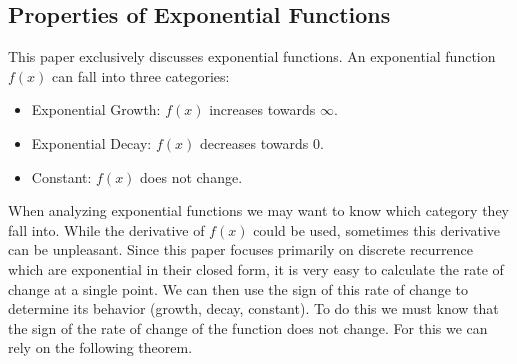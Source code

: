 \documentclass{article}
\begin{document}
\subsection{Properties of Exponential Functions}
This paper exclusively discusses exponential functions. An exponential function $f(x)$ can fall into three categories:
\begin{itemize}
    \item Exponential Growth: $f(x)$ increases towards $\infty$.
    \item Exponential Decay: $f(x)$ decreases towards 0.
    \item Constant: $f(x)$ does not change.
\end{itemize}
When analyzing exponential functions we may want to know which category they fall into. While the derivative of $f(x)$ could be used, sometimes this derivative can be unpleasant. Since this paper focuses primarily on discrete recurrence which are exponential in their closed form, it is very easy to calculate the rate of change at a single point. We can then use the sign of this rate of change to determine its behavior (growth, decay, constant). To do this we must know that the sign of the rate of change of the function does not change. For this we can rely on the following theorem.
\end{document}
